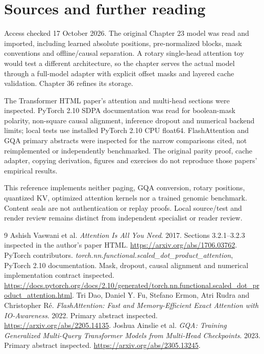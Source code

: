 \chapter*{Sources and further reading}
Access checked 17 October 2026. The original Chapter 23 model was read and
imported, including learned absolute positions, pre-normalized blocks,
mask conventions and offline/causal separation. A rotary single-head attention toy would test a different architecture, so the chapter serves the actual model through a full-model adapter with explicit offset masks and layered cache validation. Chapter 36 refines its storage.

The Transformer HTML paper's attention and multi-head sections were inspected.
PyTorch 2.10 SDPA documentation was read for boolean-mask polarity,
non-square causal alignment, inference dropout and numerical backend limits;
local tests use installed PyTorch 2.10 CPU float64. FlashAttention and GQA
primary abstracts were inspected for the narrow comparisons cited, not
reimplemented or independently benchmarked. The original parity proof,
cache adapter, copying derivation, figures and exercises do not reproduce
those papers' empirical results.

This reference implements neither paging, GQA conversion, rotary positions,
quantized KV, optimized attention kernels nor a trained genomic benchmark.
Content seals are not authentication or replay proofs. Local source/test
and render review remains distinct from independent specialist or reader review.
\begin{thebibliography}{9}
 Ashish Vaswani et al.
\emph{Attention Is All You Need}. 2017.
Sections 3.2.1--3.2.3 inspected in the author's paper HTML.
\url{https://arxiv.org/abs/1706.03762}.
 PyTorch contributors.
\emph{torch.nn.functional.scaled\_dot\_product\_attention},
PyTorch 2.10 documentation. Mask, dropout, causal alignment and
numerical implementation contract inspected.
\url{https://docs.pytorch.org/docs/2.10/generated/torch.nn.functional.scaled_dot_product_attention.html}.
 Tri Dao, Daniel Y. Fu, Stefano Ermon, Atri Rudra and
Christopher R\'e. \emph{FlashAttention: Fast and Memory-Efficient Exact
Attention with IO-Awareness}. 2022. Primary abstract inspected.
\url{https://arxiv.org/abs/2205.14135}.
 Joshua Ainslie et al.
\emph{GQA: Training Generalized Multi-Query Transformer Models from
Multi-Head Checkpoints}. 2023. Primary abstract inspected.
\url{https://arxiv.org/abs/2305.13245}.
\end{thebibliography}
